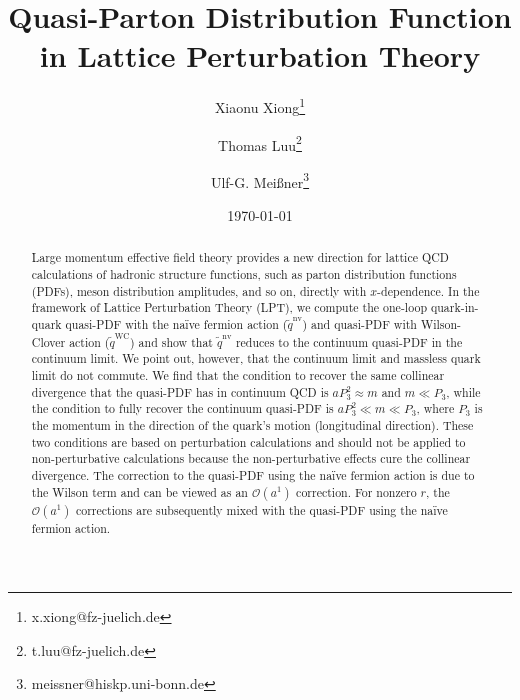 \documentclass[english,preprint,aps,prd,showpacs,superscriptaddress,nofootinbib,tightenlines]{revtex4}
\begin{document}
\title{Quasi-Parton Distribution Function in Lattice Perturbation Theory}

\author{Xiaonu Xiong\footnote{x.xiong@fz-juelich.de}}

\author{Thomas Luu\footnote{t.luu@fz-juelich.de}}

\author{Ulf-G. Mei{\ss}ner\footnote{meissner@hiskp.uni-bonn.de}}

\date{\today}

\begin{abstract}
Large momentum effective field theory provides a new direction
for lattice QCD calculations of hadronic structure functions, such as
parton distribution functions (PDFs), meson distribution amplitudes, and so on, directly
with $x$-dependence. In the framework of Lattice Perturbation Theory (LPT),
we compute the one-loop quark-in-quark quasi-PDF with the na\"ive fermion action ($\tilde{q}^{\mathrm{nv}}$) and quasi-PDF with Wilson-Clover action ($\tilde{q}^{\mathrm{WC}}$) and show that $\tilde{q}^{\mathrm{nv}}$ reduces to the
continuum quasi-PDF in the continuum limit.  We point out, however, that the continuum limit
and massless quark limit do not commute. We find that the condition to recover the same collinear divergence that the quasi-PDF has in continuum QCD is $aP_3^2\approx m$ and $m\ll P_3$, while the condition to fully recover the continuum quasi-PDF is $aP_{3}^{2}\ll m\ll P_{3}$, where $P_3$ is the momentum in the direction of the quark's motion (longitudinal direction). These two conditions are based on perturbation calculations and should not be applied to non-perturbative calculations because the non-perturbative effects cure the collinear divergence. The correction
to the quasi-PDF using the na\"ive fermion action is due to the Wilson term and can be viewed as an $\mathcal{O}\left(a^{1}\right)$ correction.
For nonzero $r$, the $\mathcal{O}\left(a^{1}\right)$ corrections are subsequently mixed with the quasi-PDF using the na\"ive fermion action.
\end{abstract}
\end{document}
